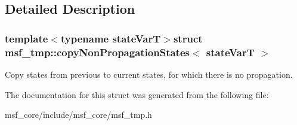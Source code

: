 \subsection{Detailed Description}
\subsubsection*{template$<$typename state\-Var\-T$>$struct msf\-\_\-tmp\-::copy\-Non\-Propagation\-States$<$ state\-Var\-T $>$}

Copy states from previous to current states, for which there is no propagation. 

The documentation for this struct was generated from the following file\-:\begin{DoxyCompactItemize}
\item 
msf\-\_\-core/include/msf\-\_\-core/msf\-\_\-tmp.\-h\end{DoxyCompactItemize}
